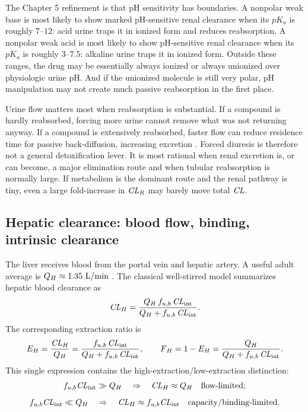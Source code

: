 \documentclass[a4paper]{article}
\newcommand{\CL}{\ensuremath{\pksym{CL}}}
\newcommand{\CLR}{\ensuremath{\pksym{CL}_{R}}}
\newcommand{\CLH}{\ensuremath{\pksym{CL}_{H}}}
\newcommand{\CLint}{\ensuremath{\pksym{CL}_{\pklab{int}}}}
\newcommand{\Fh}{\ensuremath{\pksym{F}_H}}
\newcommand{\fub}{\ensuremath{f_{u,b}}}
\newcommand{\EH}{\ensuremath{E_H}}
\newcommand{\Qh}{\ensuremath{Q_H}}
\begin{document}
The Chapter 5 refinement is that pH sensitivity has boundaries. A nonpolar weak base is most likely to show marked pH-sensitive renal clearance when its \(pK_a\) is roughly \(7\)--\(12\): acid urine traps it in ionized form and reduces reabsorption. A nonpolar weak acid is most likely to show pH-sensitive renal clearance when its \(pK_a\) is roughly \(3\)--\(7.5\): alkaline urine traps it in ionized form. Outside these ranges, the drug may be essentially always ionized or always unionized over physiologic urine pH. And if the unionized molecule is still very polar, pH manipulation may not create much passive reabsorption in the first place.

Urine flow matters most when reabsorption is substantial. If a compound is hardly reabsorbed, forcing more urine cannot remove what was not returning anyway. If a compound is extensively reabsorbed, faster flow can reduce residence time for passive back-diffusion, increasing excretion \cite{rowlandTozer2019ClinicalPKPD}. Forced diuresis is therefore not a general detoxification lever. It is most rational when renal excretion is, or can become, a major elimination route and when tubular reabsorption is normally large. If metabolism is the dominant route and the renal pathway is tiny, even a large fold-increase in \(\CLR\) may barely move total \(\CL\).

\subsection{Hepatic clearance: blood flow, binding, intrinsic clearance}

The liver receives blood from the portal vein and hepatic artery. A useful adult average is \(\Qh\approx1.35\ \pklab{L/min}\) \cite{rowlandTozer2019ClinicalPKPD}. The classical well-stirred model summarizes hepatic blood clearance as
\[
  \CLH
  =
  \frac{\Qh\,\fub\,\CLint}{\Qh+\fub\,\CLint}.
\]
The corresponding extraction ratio is
\[
  \EH
  =
  \frac{\CLH}{\Qh}
  =
  \frac{\fub\,\CLint}{\Qh+\fub\,\CLint},
  \qquad
  \Fh = 1-\EH
  =
  \frac{\Qh}{\Qh+\fub\,\CLint}.
\]
This single expression contains the high-extraction/low-extraction distinction:
\[
  \fub\CLint \gg \Qh
  \quad\Rightarrow\quad
  \CLH\approx\Qh
  \quad\text{flow-limited};
\]
\[
  \fub\CLint \ll \Qh
  \quad\Rightarrow\quad
  \CLH\approx\fub\CLint
  \quad\text{capacity/binding-limited}.
\]
\end{document}
